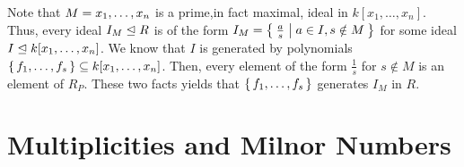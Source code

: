\documentclass[letterpaper, 11pt, oneside]{book}
\begin{document}
\begin{sol}\label{ex:UAG_4.1.11}
  Note that $M = \ideal{x_{1}, \ldots, x_{n}}$ is a prime,in fact maximal, ideal in $k[x_{1}, \ldots, x_{n}]$.
  Thus, every ideal $I_{M} \trianglelefteq R$ is of the form $I_{M} = \Set{\frac{a}{s} | a \in I, s \notin M}$ for some ideal $I \trianglelefteq k[x_{1}, \ldots, x_{n}]$.
  We know that $I$ is generated by polynomials $\set{f_{1}, \ldots, f_{s}} \subseteq k[x_{1}, \ldots, x_{n}]$.
  Then, every element of the form $\frac{1}{s}$ for $s \notin M$ is an element of $R_{P}$.
  These two facts yields that $\set{f_{1}, \ldots, f_{s}}$ generates $I_{M}$ in $R$.
\end{sol}

\clearpage

\section{Multiplicities and Milnor Numbers}
\end{document}
